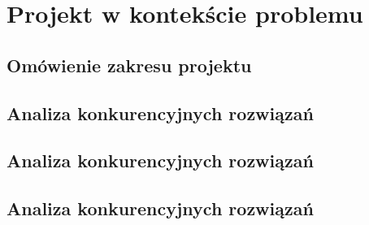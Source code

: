 \chapter{Projekt w kontekście problemu}

\section{Omówienie zakresu projektu}
\section{Analiza konkurencyjnych rozwiązań}
\section{Analiza konkurencyjnych rozwiązań}
\section{Analiza konkurencyjnych rozwiązań}
